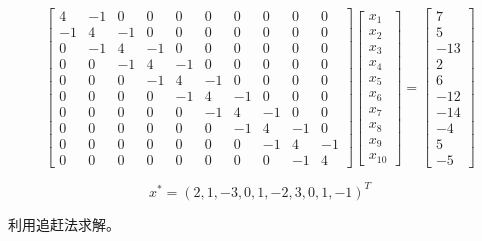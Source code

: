 \[
    \begin{bmatrix}
        4  & -1 & 0  & 0  & 0  & 0  & 0  & 0  & 0  & 0  \\
        -1 & 4  & -1 & 0  & 0  & 0  & 0  & 0  & 0  & 0  \\
        0  & -1 & 4  & -1 & 0  & 0  & 0  & 0  & 0  & 0  \\
        0  & 0  & -1 & 4  & -1 & 0  & 0  & 0  & 0  & 0  \\
        0  & 0  & 0  & -1 & 4  & -1 & 0  & 0  & 0  & 0  \\
        0  & 0  & 0  & 0  & -1 & 4  & -1 & 0  & 0  & 0  \\
        0  & 0  & 0  & 0  & 0  & -1 & 4  & -1 & 0  & 0  \\
        0  & 0  & 0  & 0  & 0  & 0  & -1 & 4  & -1 & 0  \\
        0  & 0  & 0  & 0  & 0  & 0  & 0  & -1 & 4  & -1 \\
        0  & 0  & 0  & 0  & 0  & 0  & 0  & 0  & -1 & 4
    \end{bmatrix}
    \begin{bmatrix}
        x_1 \\
        x_2 \\
        x_3 \\
        x_4 \\
        x_5 \\
        x_6 \\
        x_7 \\
        x_8 \\
        x_9 \\
        x_{10}
    \end{bmatrix}
    =
    \begin{bmatrix}
        7   \\
        5   \\
        -13 \\
        2   \\
        6   \\
        -12 \\
        -14 \\
        -4  \\
        5   \\
        -5
    \end{bmatrix}
\]

\[ x^* = (2, 1, -3, 0, 1, -2, 3, 0, 1, -1)^T \]

利用追赶法求解。